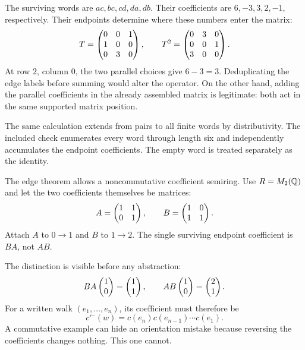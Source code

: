 The surviving words are $ac,bc,cd,da,db$. Their coefficients are $6,-3,3,2,-1$, respectively. Their endpoints determine where these numbers enter the matrix:
\[
T=\begin{pmatrix}0&0&1\\1&0&0\\0&3&0\end{pmatrix},\qquad
T^2=\begin{pmatrix}0&3&0\\0&0&1\\3&0&0\end{pmatrix}.
\]
At row $2$, column $0$, the two parallel choices give $6-3=3$. Deduplicating the edge labels before summing would alter the operator. On the other hand, adding the parallel coefficients in the already assembled matrix is legitimate: both act in the same supported matrix position.

The same calculation extends from pairs to all finite words by distributivity. The included check enumerates every word through length six and independently accumulates the endpoint coefficients. The empty word is treated separately as the identity.


The edge theorem allows a noncommutative coefficient semiring. Use $R=M_2(\mathbb Q)$ and let the two coefficients themselves be matrices:
\[
A=\begin{pmatrix}1&1\\0&1\end{pmatrix},\qquad B=\begin{pmatrix}1&0\\1&1\end{pmatrix}.
\]
Attach $A$ to $0\to1$ and $B$ to $1\to2$. The single surviving endpoint coefficient is $BA$, not $AB$.


The distinction is visible before any abstraction:
\[
BA\begin{pmatrix}1\\0\end{pmatrix}=\begin{pmatrix}1\\1\end{pmatrix},\qquad
AB\begin{pmatrix}1\\0\end{pmatrix}=\begin{pmatrix}2\\1\end{pmatrix}.
\]
For a written walk $(e_1,\ldots,e_n)$, its coefficient must therefore be
\[
c^\leftarrow(w)=c(e_n)c(e_{n-1})\cdots c(e_1).
\]
A commutative example can hide an orientation mistake because reversing the coefficients changes nothing. This one cannot.

